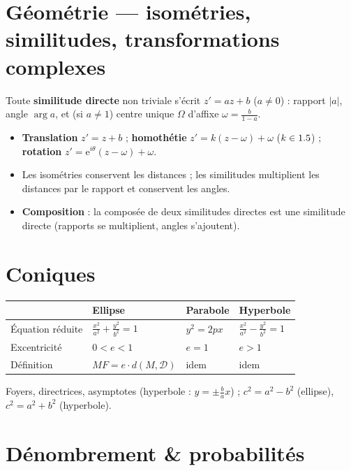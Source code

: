 \section{Géométrie — isométries, similitudes, transformations complexes}

\begin{aretenir}
Toute \textbf{similitude directe} non triviale s'écrit $z'=az+b$ ($a\ne0$) : rapport $|a|$,
angle $\arg a$, et (si $a\ne1$) centre unique $\Omega$ d'affixe $\omega=\frac b{1-a}$.
\end{aretenir}

\begin{itemize}
\item \textbf{Translation} $z'=z+b$ ; \textbf{homothétie} $z'=k(z-\omega)+\omega$ ($k\in1.5$) ;
      \textbf{rotation} $z'=\mathrm{e}^{i\theta}(z-\omega)+\omega$.
\item Les isométries conservent les distances ; les similitudes multiplient les distances par le rapport et conservent les angles.
\item \textbf{Composition} : la composée de deux similitudes directes est une similitude directe (rapports se multiplient, angles s'ajoutent).
\end{itemize}

\section{Coniques}

\begin{center}\small
\begin{tabular}{@{}llll@{}}
\toprule
& Ellipse & Parabole & Hyperbole\\
\midrule
Équation réduite & $\frac{x^2}{a^2}+\frac{y^2}{b^2}=1$ & $y^2=2px$ & $\frac{x^2}{a^2}-\frac{y^2}{b^2}=1$\\
Excentricité & $0<e<1$ & $e=1$ & $e>1$\\
Définition & $MF=e\cdot d(M,\mathcal D)$ & idem & idem\\
\bottomrule
\end{tabular}
\end{center}
Foyers, directrices, asymptotes (hyperbole : $y=\pm\frac ba x$) ; $c^2=a^2-b^2$ (ellipse), $c^2=a^2+b^2$ (hyperbole).

\section{Dénombrement \& probabilités}

